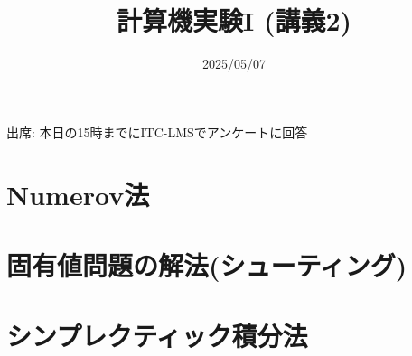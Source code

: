 \documentclass[10pt,dvipdfmx]{beamer}
\title{計算機実験I (講義2)}
\date{2025/05/07}
\begin{document}
\begin{frame}
  \titlepage
  \tableofcontents
  出席: 本日の15時までにITC-LMSでアンケートに回答
\end{frame}



\section{Numerov法}





\section{固有値問題の解法(シューティング)}




\section{シンプレクティック積分法}






% 
% 
% 





\section{}

\end{document}
